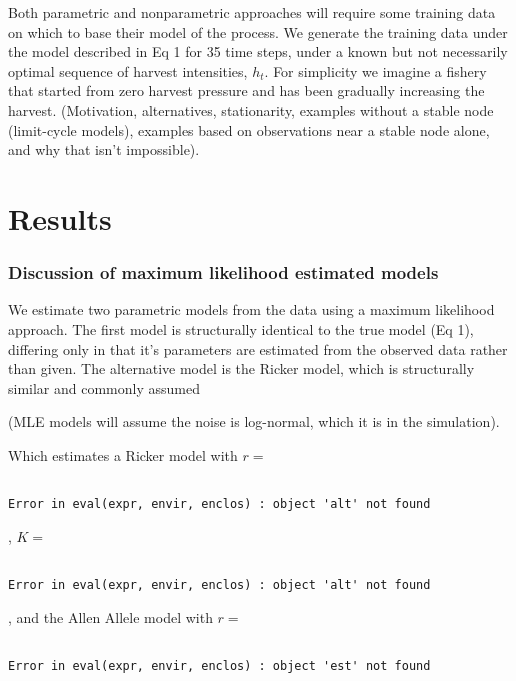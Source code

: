 \documentclass[author-year, review]{elsarticle} %
\begin{document}
Both parametric and nonparametric approaches will require some training
data on which to base their model of the process. We generate the
training data under the model described in Eq 1 for 35 time steps, under
a known but not necessarily optimal sequence of harvest intensities,
$h_t$. For simplicity we imagine a fishery that started from zero
harvest pressure and has been gradually increasing the harvest.
(Motivation, alternatives, stationarity, examples without a stable node
(limit-cycle models), examples based on observations near a stable node
alone, and why that isn't impossible).

\section{Results}

\subsubsection{Discussion of maximum likelihood estimated models}

We estimate two parametric models from the data using a maximum
likelihood approach. The first model is structurally identical to the
true model (Eq 1), differing only in that it's parameters are estimated
from the observed data rather than given. The alternative model is the
Ricker model, which is structurally similar and commonly assumed

(MLE models will assume the noise is log-normal, which it is in the
simulation).

Which estimates a Ricker model with $r =$

\begin{verbatim}

Error in eval(expr, envir, enclos) : object 'alt' not found
\end{verbatim}

, $K =$

\begin{verbatim}

Error in eval(expr, envir, enclos) : object 'alt' not found
\end{verbatim}

, and the Allen Allele model with $r =$

\begin{verbatim}

Error in eval(expr, envir, enclos) : object 'est' not found
\end{verbatim}
\end{document}
